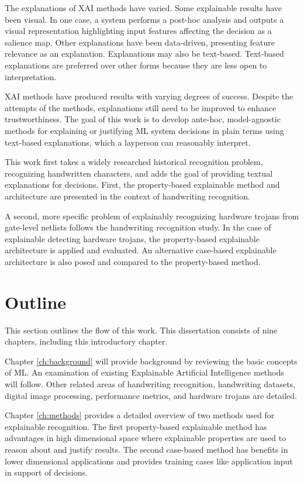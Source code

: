 The explanations of XAI methods have varied. Some explainable results have been
visual. In one case, a system performs a post-hoc analysis and outputs a visual
representation highlighting input features affecting the decision as a salience
map. Other explanations have been data-driven, presenting feature relevance as
an explanation. Explanations may also be text-based\cite{vilone2020explainable}.
Text-based explanations are preferred over other forms because they are less
open to interpretation.

XAI methods have produced results with varying degrees of success. Despite the
attempts of the methods, explanations still need to be improved to enhance
trustworthiness. The goal of this work is to develop ante-hoc, model-agnostic
methods for explaining or justifying ML system decisions in plain terms using
text-based explanations, which a layperson can reasonably interpret.

This work first takes a widely researched historical recognition problem,
recognizing handwritten characters, and adds the goal of providing textual
explanations for decisions. First, the property-based explainable method and
architecture are presented in the context of handwriting recognition.

A second, more specific problem of explainably recognizing hardware trojans from
gate-level netlists follows the handwriting recognition study. In the case of
explainable detecting hardware trojans, the property-based explainable
architecture is applied and evaluated. An alternative case-based explainable
architecture is also posed and compared to the property-based method.

\section{Outline}

This section outlines the flow of this work. This dissertation consists of nine
chapters, including this introductory chapter.

Chapter \ref{ch:background} will provide background by reviewing the basic
concepts of ML. An examination of existing Explainable Artificial Intelligence
methods will follow. Other related areas of handwriting recognition, handwriting
datasets, digital image processing, performance metrics, and hardware trojans
are detailed.

Chapter \ref{ch:methods} provides a detailed overview of two methods used for
explainable recognition. The first property-based explainable method has
advantages in high dimensional space where explainable properties are used to
reason about and justify results. The second case-based method has benefits in
lower dimensional applications and provides training cases like application
input in support of decisions.


